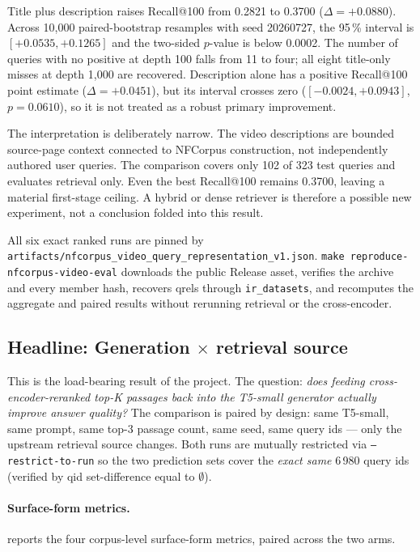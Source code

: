 \documentclass[11pt,a4paper]{article}
\makeatletter
\newcommand{\fdev}{6\,980}
\newcommand{\recallH}{Recall@100}
\makeatother
\begin{document}
Title plus description raises \recallH{} from 0.2821 to 0.3700
($\Delta=+0.0880$).  Across 10,000 paired-bootstrap resamples with
seed 20260727, the 95\,\% interval is
$[+0.0535,+0.1265]$ and the two-sided $p$-value is below 0.0002.
The number of queries with no positive at depth 100 falls from 11 to
four; all eight title-only misses at depth 1,000 are recovered.
Description alone has a positive \recallH{} point estimate
($\Delta=+0.0451$), but its interval crosses zero
($[-0.0024,+0.0943]$, $p=0.0610$), so it is not treated as a robust
primary improvement.

The interpretation is deliberately narrow.  The video descriptions
are bounded source-page context connected to NFCorpus construction,
not independently authored user queries.  The comparison covers only
102 of 323 test queries and evaluates retrieval only.  Even the best
\recallH{} remains 0.3700, leaving a material first-stage ceiling.
A hybrid or dense retriever is therefore a possible new experiment,
not a conclusion folded into this result.

All six exact ranked runs are pinned by
\texttt{artifacts/nfcorpus\_video\_query\_representation\_v1.json}.
\texttt{make reproduce-nfcorpus-video-eval} downloads the public
Release asset, verifies the archive and every member hash, recovers
qrels through \texttt{ir\_datasets}, and recomputes the aggregate and
paired results without rerunning retrieval or the cross-encoder.

\subsection{Headline: Generation $\times$ retrieval source}
\label{sec:gen-x-retrieval}

This is the load-bearing result of the project.  The question:
\emph{does feeding cross-encoder-reranked top-K passages back into
the T5-small generator actually improve answer quality?}  The
comparison is paired by design: same T5-small, same prompt, same
top-3 passage count, same seed, same query ids --- only the
upstream retrieval source changes.  Both runs are mutually
restricted via \texttt{--restrict-to-run} so the two prediction
sets cover the \emph{exact same} \fdev{} query ids (verified by
qid set-difference equal to $\emptyset$).

\paragraph{Surface-form metrics.}   reports
the four corpus-level surface-form metrics, paired across the two
arms.
\end{document}
